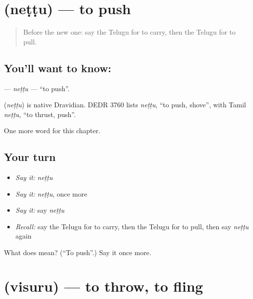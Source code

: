 \section[\texorpdfstring{\te{నెట్టు} (neṭṭu)}{నెట్టు (neṭṭu)}]{ (neṭṭu) — to push}

\label{lesson:TE-C240-nettu}



\begin{quote}
Before the new one: say the Telugu for to carry, then the Telugu for to pull.
\end{quote}

\subsection*{You'll want to know: }
\textbf{} — \emph{neṭṭu} — \textquotedblleft{}to push\textquotedblright{}.

\begin{cousinweb}
\textbf{} (\emph{neṭṭu}) is native Dravidian. DEDR 3760 lists \emph{neṭṭu}, \textquotedblleft{}to push, shove\textquotedblright{}, with Tamil \emph{neṭṭu}, \textquotedblleft{}to thrust, push\textquotedblright{}.
\end{cousinweb}

\begin{grammarlens}[title={What you've built}]
One more word for this chapter.
\end{grammarlens}

\subsection*{Your turn}
\begin{itemize}
\raggedright
  \item \emph{Say it:} \emph{neṭṭu}
  \item \emph{Say it:} \emph{neṭṭu}, once more
  \item \emph{Say it:} say \emph{neṭṭu}
  \item \emph{Recall:} say the Telugu for to carry, then the Telugu for to pull, then say \emph{neṭṭu} again
\end{itemize}

\begin{tcolorbox}[breakable,colback=teal!4,colframe=teal!35!black,title={Before you move on}]
What does  mean? (\textquotedblleft{}To push\textquotedblright{}.) Say it once more.
\end{tcolorbox}
\section[\texorpdfstring{\te{విసురు} (visuru)}{విసురు (visuru)}]{ (visuru) — to throw, to fling}

